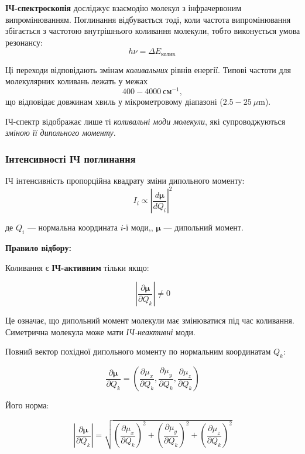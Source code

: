 {\textbf{ІЧ-спектроскопія} досліджує взаємодію молекул з інфрачервоним випромінюванням.
Поглинання відбувається тоді, коли частота випромінювання збігається з частотою
внутрішнього коливання молекули, тобто виконується умова резонансу:
\[
    h\nu = \Delta E_{\text{колив.}}
\]

Ці переходи відповідають змінам \emph{коливальних} рівнів енергії.
Типові частоти для молекулярних коливань лежать у межах
\[
    400 - 4000~\text{см}^{-1},
\]
що відповідає довжинам хвиль у мікрометровому діапазоні ($2.5 - 25~\mu$m).

ІЧ-спектр відображає лише ті \textit{коливальні моди молекули}, які супроводжуються \emph{зміною її дипольного моменту}.


\subsubsection{Інтенсивності ІЧ поглинання}

ІЧ інтенсивність пропорційна квадрату зміни дипольного моменту:
\[
    I_i \propto \left|\frac{d\boldsymbol{\mu}}{dQ_i}\right|^2
\]

де $Q_i$ --- нормальна координата $i$-ї моди,, $\boldsymbol{\mu}$ --- дипольний момент.

\textbf{Правило відбору:}

Коливання є \textbf{ІЧ-активним} тільки якщо:

\begin{equation}
    \left| \frac{\partial \boldsymbol{\mu}}{\partial Q_k} \right| \neq 0
\end{equation}

Це означає, що дипольний момент молекули має змінюватися під час коливання. Симетрична молекула може мати \emph{ІЧ-неактивні} моди.

Повний вектор похідної дипольного моменту по нормальним координатам $Q_k$:

\begin{equation}
    \frac{\partial \boldsymbol{\mu}}{\partial Q_k} = \left( \frac{\partial \mu_x}{\partial Q_k}, \frac{\partial \mu_y}{\partial Q_k}, \frac{\partial \mu_z}{\partial Q_k} \right)
\end{equation}

Його норма:

\begin{equation}
    \left| \frac{\partial \boldsymbol{\mu}}{\partial Q_k} \right| = \sqrt{\left(\frac{\partial \mu_x}{\partial Q_k}\right)^2 + \left(\frac{\partial \mu_y}{\partial Q_k}\right)^2 + \left(\frac{\partial \mu_z}{\partial Q_k}\right)^2}
\end{equation}

}
